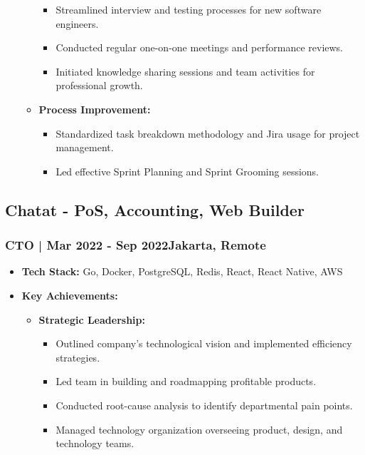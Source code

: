 \documentclass[11pt]{article}
\begin{document}
\begin{itemize}
\begin{itemize}
        \begin{itemize}
            \item Streamlined interview and testing processes for new software engineers.
            \item Conducted regular one-on-one meetings and performance reviews.
            \item Initiated knowledge sharing sessions and team activities for professional growth.
        \end{itemize}
        \item \textbf{Process Improvement:}
        \begin{itemize}
            \item Standardized task breakdown methodology and Jira usage for project management.
            \item Led effective Sprint Planning and Sprint Grooming sessions.
        \end{itemize}
    \end{itemize}
\end{itemize}

\subsection{Chatat - PoS, Accounting, Web Builder}
\subsubsection{CTO | Mar 2022 - Sep 2022\hfill Jakarta, Remote}
\begin{itemize}
    \item \textbf{Tech Stack:} Go, Docker, PostgreSQL, Redis, React, React Native, AWS
    \item \textbf{Key Achievements:}
    \begin{itemize}
        \item \textbf{Strategic Leadership:}
        \begin{itemize}
            \item Outlined company's technological vision and implemented efficiency strategies.
            \item Led team in building and roadmapping profitable products.
            \item Conducted root-cause analysis to identify departmental pain points.
            \item Managed technology organization overseeing product, design, and technology teams.
        \end{itemize}
    \end{itemize}
\end{itemize}
\end{document}
